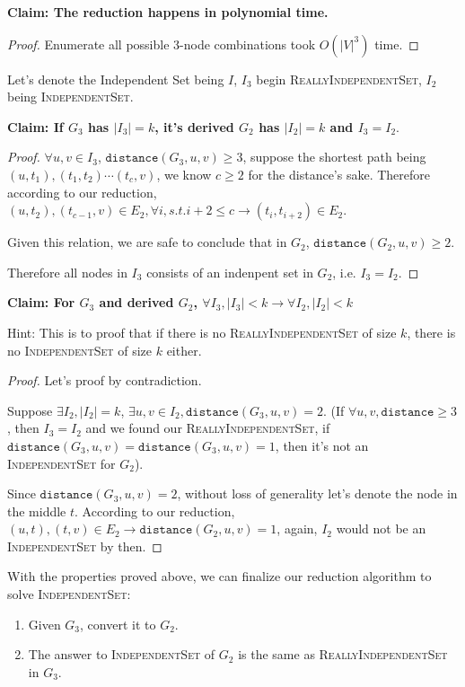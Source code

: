 \textbf{Claim: The reduction happens in polynomial time.}
\begin{proof}
    Enumerate all possible 3-node combinations took $O(|V|^3)$ time.
\end{proof}

Let's denote the Independent Set being $I$, $I_3$ begin \textsc{ReallyIndependentSet}, $I_2$ being \textsc{IndependentSet}.

\textbf{Claim: If $G_3$ has $|I_3| = k$, it's derived $G_2$ has $|I_2| = k$ and $I_3 = I_2$}.
\begin{proof}

    $\forall u, v \in I_3$, $\texttt{distance}(G_3, u, v) \ge 3$, suppose the shortest path being $(u, t_1), (t_1, t_2) \cdots (t_c, v)$, we know $c \ge 2$ for the distance's sake. Therefore according to our reduction, $(u, t_2), (t_{c-1}, v) \in E_2, \forall i, s.t. i+2 \le c \rightarrow (t_i, t_{i+2}) \in E_2$.
    
    Given this relation, we are safe to conclude that in $G_2$, $\texttt{distance}(G_2, u, v) \ge 2$.

    Therefore all nodes in $I_3$ consists of an indenpent set in $G_2$, i.e. $I_3 = I_2$.
\end{proof}

\textbf{Claim: For $G_3$ and derived $G_2$,  $\forall I_3, |I_3| < k \rightarrow \forall I_2, |I_2| < k$}

Hint: This is to proof that if there is no \textsc{ReallyIndependentSet} of size $k$, there is no \textsc{IndependentSet} of size $k$ either.

\begin{proof}
    Let's proof by contradiction.

    Suppose $\exists I_2, |I_2| = k$, $\exists u, v \in I_2, \texttt{distance}(G_3, u, v) = 2$.
    (If $\forall u, v, \texttt{distance} \ge 3$, then $I_3 = I_2$ and we found our \textsc{ReallyIndependentSet}, if $ \texttt{distance}(G_3, u, v) = \texttt{distance}(G_3, u, v) = 1$, then it's not an \textsc{IndependentSet} for $G_2$).

    Since $\texttt{distance}(G_3, u, v) = 2$, without loss of generality let's denote the node in the middle $t$.
    According to our reduction, $(u, t), (t, v) \in E_2 \rightarrow \texttt{distance}(G_2, u, v) = 1$, again, $I_2$ would not be an \textsc{IndependentSet} by then.
\end{proof}

With the properties proved above, we can finalize our reduction algorithm to solve \textsc{IndependentSet}:

\begin{enumerate}
    \item Given $G_3$, convert it to $G_2$.
    \item The answer to \textsc{IndependentSet} of $G_2$ is the same as \textsc{ReallyIndependentSet} in $G_3$.
\end{enumerate}


